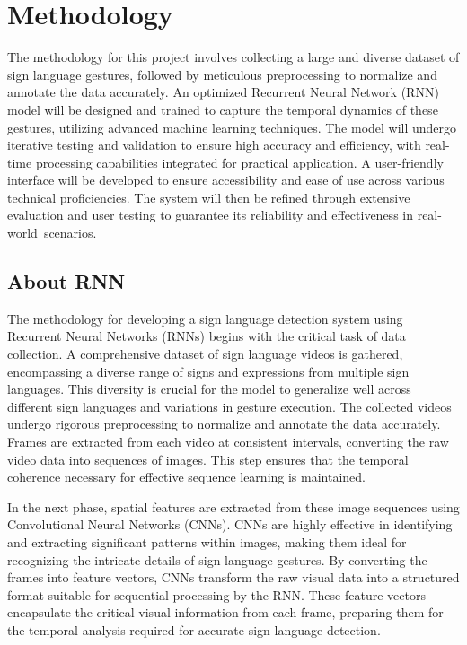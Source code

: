 \chapter{Methodology} The methodology for this project involves collecting a large and diverse dataset of sign language gestures, followed by meticulous preprocessing to normalize and annotate the data accurately. An optimized Recurrent Neural Network (RNN) model will be designed and trained to capture the temporal dynamics of these gestures, utilizing advanced machine learning techniques. The model will undergo iterative testing and validation to ensure high accuracy and efficiency, with real-time processing capabilities integrated for practical application. A user-friendly interface will be developed to ensure accessibility and ease of use across various technical proficiencies. The system will then be refined through extensive evaluation and user testing to guarantee its reliability and effectiveness in real-world scenarios.
\section{About RNN}
The methodology for developing a sign language detection system using Recurrent Neural Networks (RNNs) begins with the critical task of data collection. A comprehensive dataset of sign language videos is gathered, encompassing a diverse range of signs and expressions from multiple sign languages. This diversity is crucial for the model to generalize well across different sign languages and variations in gesture execution. The collected videos undergo rigorous preprocessing to normalize and annotate the data accurately. Frames are extracted from each video at consistent intervals, converting the raw video data into sequences of images. This step ensures that the temporal coherence necessary for effective sequence learning is maintained.

In the next phase, spatial features are extracted from these image sequences using Convolutional Neural Networks (CNNs). CNNs are highly effective in identifying and extracting significant patterns within images, making them ideal for recognizing the intricate details of sign language gestures. By converting the frames into feature vectors, CNNs transform the raw visual data into a structured format suitable for sequential processing by the RNN. These feature vectors encapsulate the critical visual information from each frame, preparing them for the temporal analysis required for accurate sign language detection.

